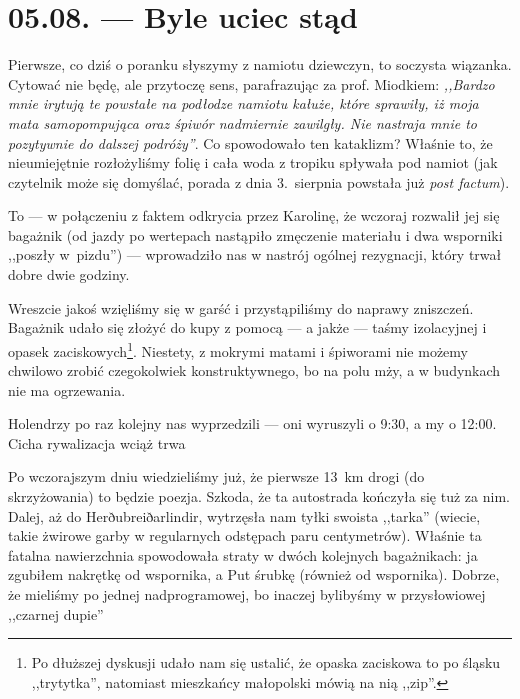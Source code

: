 \chapter*{05.08. --- Byle uciec stąd\textellipsis}

Pierwsze, co dziś o poranku słyszymy z namiotu dziewczyn, to soczysta wiązanka. Cytować nie będę, ale przytoczę sens, parafrazując za prof. Miodkiem: \emph{,,Bardzo mnie irytują te powstałe na podłodze namiotu kałuże, które sprawiły, iż moja mata samopompująca oraz śpiwór nadmiernie zawilgły. Nie nastraja mnie to pozytywnie do dalszej podróży''}. Co spowodowało ten kataklizm? Właśnie to, że nieumiejętnie rozłożyliśmy folię i cała woda z tropiku spływała pod namiot (jak czytelnik może się domyślać, porada z dnia 3.~sierpnia powstała już \textit{post factum}).

To --- w połączeniu z faktem odkrycia przez Karolinę, że wczoraj rozwalił jej się bagażnik (od jazdy po wertepach nastąpiło zmęczenie materiału i dwa wsporniki ,,poszły w~pizdu'') --- wprowadziło nas w nastrój ogólnej rezygnacji, który trwał dobre dwie godziny.

Wreszcie jakoś wzięliśmy się w garść i przystąpiliśmy do naprawy zniszczeń. Bagażnik udało się złożyć do kupy z pomocą --- a jakże --- taśmy izolacyjnej i opasek zaciskowych\footnote{Po dłuższej dyskusji udało nam się ustalić, że opaska zaciskowa to po śląsku ,,trytytka'', natomiast mieszkańcy małopolski mówią na nią ,,zip''.}. Niestety, z mokrymi matami i śpiworami nie możemy chwilowo zrobić czegokolwiek konstruktywnego, bo na polu mży, a w budynkach nie ma ogrzewania.

Holendrzy po raz kolejny nas wyprzedzili --- oni wyruszyli o 9:30, a my o 12:00. Cicha rywalizacja wciąż trwa\textellipsis

Po wczorajszym dniu wiedzieliśmy już, że pierwsze 13~km drogi (do skrzyżowania) to będzie poezja. Szkoda, że ta autostrada kończyła się tuż za nim. Dalej, aż do Herðubreiðarlindir, wytrzęsła nam tyłki swoista ,,tarka'' (wiecie, takie żwirowe garby w regularnych odstępach paru centymetrów). Właśnie ta fatalna nawierzchnia spowodowała straty w dwóch kolejnych bagażnikach: ja zgubiłem nakrętkę od wspornika, a Put śrubkę (również od wspornika). Dobrze, że mieliśmy po jednej nadprogramowej, bo inaczej bylibyśmy w przysłowiowej ,,czarnej dupie''\textellipsis


